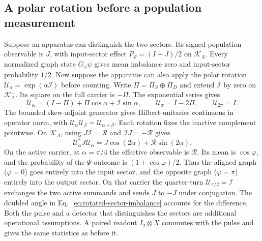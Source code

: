 \documentclass[11pt]{article}
\theoremstyle{definition}
\begin{document}
\subsection{A polar rotation before a population measurement}

Suppose an apparatus can distinguish the two sectors. Its signed population observable is $J$, with input-sector effect $P_\Psi=(I+J)/2$ on $\mathcal K_A$. Every normalized graph state $G_\varphi\psi$ gives mean imbalance zero and input-sector probability $1/2$. Now suppose the apparatus can also apply the polar rotation $\mathcal U_\alpha=\exp(\alpha\mathcal I)$ before counting. Write $\Pi=\Pi_S\oplus\Pi_D$ and extend $\mathcal I$ by zero on $\mathcal K_A^\perp$. Its square on the full carrier is $-\Pi$. The exponential series gives
\begin{equation}
 \mathcal U_\alpha=(I-\Pi)+\Pi\cos\alpha+\mathcal I\sin\alpha,\qquad
 \mathcal U_\pi=I-2\Pi,\qquad \mathcal U_{2\pi}=I .
 \label{eq:full-polar-rotation}
\end{equation}
The bounded skew-adjoint generator gives Hilbert-unitaries continuous in operator norm, with $\mathcal U_\alpha\mathcal U_\beta=\mathcal U_{\alpha+\beta}$. Each rotation fixes the inactive complement pointwise. On $\mathcal K_A$, using $J\mathcal I=\mathcal R$ and $\mathcal I J=-\mathcal R$ gives
\begin{equation}
 \mathcal U_\alpha^*J\mathcal U_\alpha
 =J\cos(2\alpha)+\mathcal R\sin(2\alpha).
 \label{eq:rotated-sector-imbalance}
\end{equation}
On the active carrier, at $\alpha=\pi/4$ the effective observable is $\mathcal R$. Its mean is $\cos\varphi$, and the probability of the $\Psi$ outcome is $(1+\cos\varphi)/2$. Thus the aligned graph ($\varphi=0$) goes entirely into the input sector, and the opposite graph ($\varphi=\pi$) entirely into the output sector. On that carrier the quarter-turn $\mathcal U_{\pi/2}=\mathcal I$ exchanges the two active summands and sends $J$ to $-J$ under conjugation. The doubled angle in Eq.~\eqref{eq:rotated-sector-imbalance} accounts for the difference. Both the pulse and a detector that distinguishes the sectors are additional operational assumptions. A paired readout $I_2\otimes X$ commutes with the pulse and gives the same statistics as before it.
\end{document}
